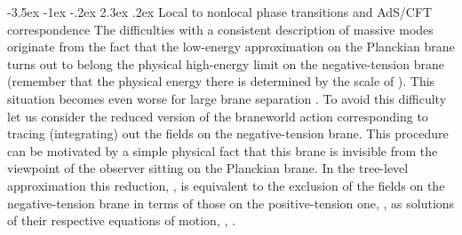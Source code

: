 \documentclass[a4paper,12pt]{article}
\makeatletter
\renewcommand\section{\@startsection {section}{1}{\z@}%
                                   {-3.5ex \@plus -1ex \@minus -.2ex}%
                                   {2.3ex \@plus.2ex}%
                                   {\normalfont\large\bfseries}}
\makeatother
\begin{document}
\section{Local to nonlocal phase transitions and AdS/CFT
corre\-spondence} \label{sec:3}
The difficulties with a consistent description of massive modes
originate from the fact that the low-energy approximation on
the Planckian brane turns out to belong the physical high-energy
limit on the negative-tension brane (remember that the physical
energy there is determined by the scale of
\coordHE{}). This situation becomes
even worse for large brane separation \coordHE{}. To avoid
this difficulty let us consider the reduced version of the braneworld
action corresponding to tracing (integrating) out the fields on the
negative-tension brane. This procedure can be motivated by a simple
physical fact that this brane is invisible from the viewpoint of the
observer sitting on the Planckian brane. In the tree-level
approximation this reduction, \coordHE{}, is equivalent to the exclusion of
the fields on the negative-tension brane in terms of those on the
positive-tension one, \coordHE{}, as solutions
of their respective equations of motion,
\coordHE{},
\myHighlight{$\phi^-=\phi^-[\,\phi^+]$}\coordHE{}.
\end{document}
